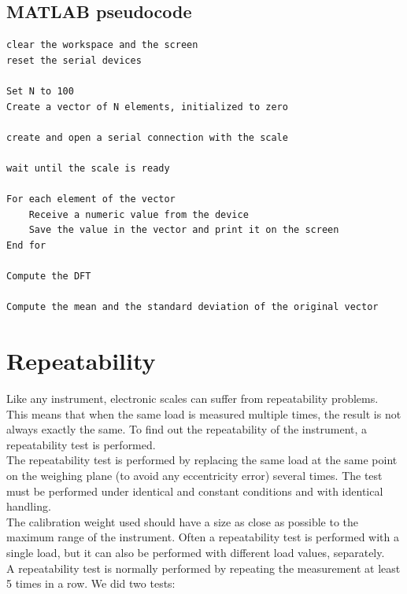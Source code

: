 \subsection{MATLAB pseudocode}

\begin{verbatim}
clear the workspace and the screen
reset the serial devices

Set N to 100
Create a vector of N elements, initialized to zero

create and open a serial connection with the scale

wait until the scale is ready

For each element of the vector
    Receive a numeric value from the device
    Save the value in the vector and print it on the screen
End for

Compute the DFT

Compute the mean and the standard deviation of the original vector
\end{verbatim}

\section{Repeatability}

Like any instrument, electronic scales can suffer from repeatability problems. This means that when the same load is measured multiple times, the result is not always exactly the same. To find out the repeatability of the instrument, a repeatability test is performed.
\\
The repeatability test is performed by replacing the same load at the same point on the weighing plane (to avoid any eccentricity error) several times. The test must be performed under identical and constant conditions and with identical handling.
\\
The calibration weight used should have a size as close as possible to the maximum range of the instrument. Often a repeatability test is performed with a single load, but it can also be performed with different load values, separately.
\\
A repeatability test is normally performed by repeating the measurement at least 5 times in a row. We did two tests:\\


